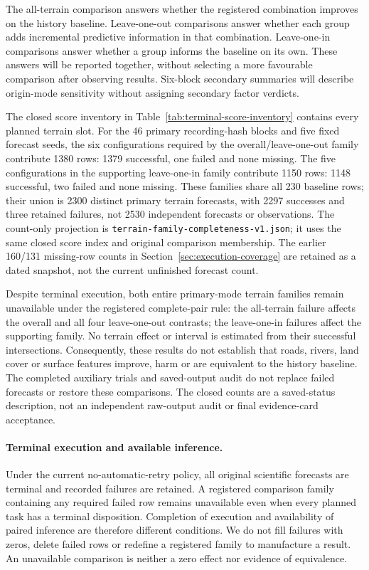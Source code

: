 \documentclass[11pt]{article}
\begin{document}
The all-terrain comparison answers whether the registered combination improves
on the history baseline. Leave-one-out comparisons answer whether each group
adds incremental predictive information in that combination. Leave-one-in
comparisons answer whether a group informs the baseline on its own. These
answers will be reported together, without selecting a more favourable
comparison after observing results. Six-block secondary summaries will
describe origin-mode sensitivity without assigning secondary factor verdicts.

The closed score inventory in Table~\ref{tab:terminal-score-inventory}
contains every planned terrain slot. For the 46 primary recording-hash
blocks and five fixed forecast seeds, the six configurations required by
the overall/leave-one-out family contribute 1380 rows: 1379 successful,
one failed and none missing. The five configurations in the supporting
leave-one-in family contribute 1150 rows: 1148 successful, two failed and
none missing. These families share all 230 baseline rows; their union is
2300 distinct primary terrain forecasts, with 2297 successes and three
retained failures, not 2530 independent forecasts or observations.
The count-only projection is \texttt{terrain-family-completeness-v1.json};
it uses the same closed score index and original comparison membership.
The earlier 160/131 missing-row counts in
Section~\ref{sec:execution-coverage} are retained as a dated snapshot,
not the current unfinished forecast count.

Despite terminal execution, both entire primary-mode terrain families
remain unavailable under the registered complete-pair rule: the
all-terrain failure affects the overall and all four leave-one-out
contrasts; the leave-one-in failures affect the supporting family.
No terrain effect or interval is estimated from their successful
intersections. Consequently, these results do not establish that roads,
rivers, land cover or surface features improve, harm or are equivalent to
the history baseline. The completed auxiliary trials and saved-output audit
do not replace failed forecasts or restore these comparisons.
The closed counts are a saved-status description, not an independent
raw-output audit or final evidence-card acceptance.

\paragraph{Terminal execution and available inference.}
\label{sec:terminal-failures}
Under the current no-automatic-retry policy, all original scientific
forecasts are terminal and recorded failures are retained. A registered comparison
family containing any required failed row remains unavailable even when
every planned task has a terminal disposition. Completion of execution and
availability of paired inference are therefore different conditions. We do
not fill failures with zeros, delete failed rows or redefine a registered
family to manufacture a result. An unavailable comparison is neither a zero
effect nor evidence of equivalence.
\end{document}
